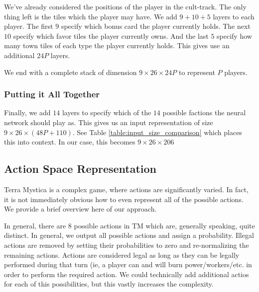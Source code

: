 \documentclass[12pt,twocolumn,letterpaper]{article}
\begin{document}
We've already considered the positions of the player in the cult-track. The only thing left is the tiles which the player may have. We add $9 + 10 + 5$ layers to each player. The first $9$ specify which bonus card the player currently holds. The next $10$ specify which favor tiles the player currently owns. And the last $5$ specify how many town tiles of each type the player currently holds. This gives use an additional $24P$ layers.

We end with a complete stack of dimension $9 \times 26 \times 24P$ to represent $P$ players.

\subsubsection{Putting it All Together}
\label{subsubsection:final_input}
Finally, we add $14$ layers to specify which of the $14$ possible factions the neural network should play as. This gives us an input representation of size $9 \times 26 \times (48P + 110)$. See Table \ref{table:input_size_comparison} which places this into context. In our case, this becomes $9 \times 26 \times 206$

\subsection{Action Space Representation}
\label{section:action_space_representation}
Terra Mystica is a complex game, where actions are significantly varied. In fact, it is not immediately obvious how to even represent all of the possible actions. We provide a brief overview here of our approach.

In general, there are 8 possible actions in TM which are, generally speaking, quite distinct. In general, we output all possible actions and assign a probability. Illegal actions are removed by setting their probabilities to zero and re-normalizing the remaining actions. Actions are considered legal as long as they can be legally performed during that turn (ie, a player can and will burn power/workers/etc. in order to perform the required action. We could technically add additional actios for each of this possibilities, but this vastly increases the complexity.
\end{document}
